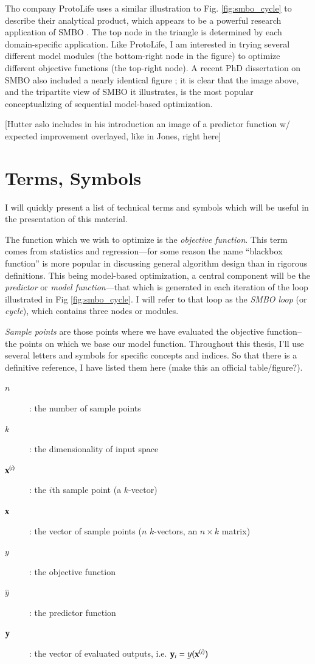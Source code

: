 Tho company ProtoLife uses a similar illustration to Fig. \ref{fig:smbo_cycle} to describe their analytical product, which appears to be a powerful research application of SMBO \citep{protolife_pdt_2013}. The top node in the triangle is determined by each domain-specific application. Like ProtoLife, I am interested in trying several different model modules (the bottom-right node in the figure) to optimize different objective functions (the top-right node). A recent PhD dissertation on SMBO also included a nearly identical figure \cite{hutter_sequential_2011}; it is clear that the image above, and the tripartite view of SMBO it illustrates, is the most popular conceptualizing of sequential model-based optimization.

[Hutter aslo includes in his introduction an image of a predictor function w/ expected improvement overlayed, like in Jones, right here]

\section{Terms, Symbols}

I will quickly present a list of technical terms and symbols which will be useful in the presentation of this material.

The function which we wish to optimize is the \emph{objective function}. This term comes from statistics and regression---for some reason the name ``blackbox function'' is more popular in discussing general algorithm design than in rigorous definitions. This being model-based optimization, a central component will be the \emph{predictor} or \emph{model function}---that which is generated in each iteration of the loop illustrated in Fig \ref{fig:smbo_cycle}. I will refer to that loop as the \emph{SMBO loop} (or \emph{cycle}), which contains three nodes or modules. 

\emph{Sample points} are those points where we have evaluated the objective function--the points on which we base our model function. Throughout this thesis, I'll use several letters and symbols for specific concepts and indices. So that there is a definitive reference, I have listed them here (make this an official table/figure?).

\begin{description}
  \item[$n$]: the number of sample points
  \item[$k$]: the dimensionality of input space
  \item[$\mathbf{x}^{(i)}$]: the $i$th sample point (a $k$-vector)
  \item[$\mathbf{x}$]: the vector of sample points ($n$ $k$-vectors, an $n\times k$ matrix)
  \item[$y$]: the objective function
  \item[$\hat{y}$]: the predictor function
  \item[$\mathbf{y}$]: the vector of evaluated outputs, i.e. $\mathbf{y}_i=y(\mathbf{x}^{(i)})$
\end{description}

